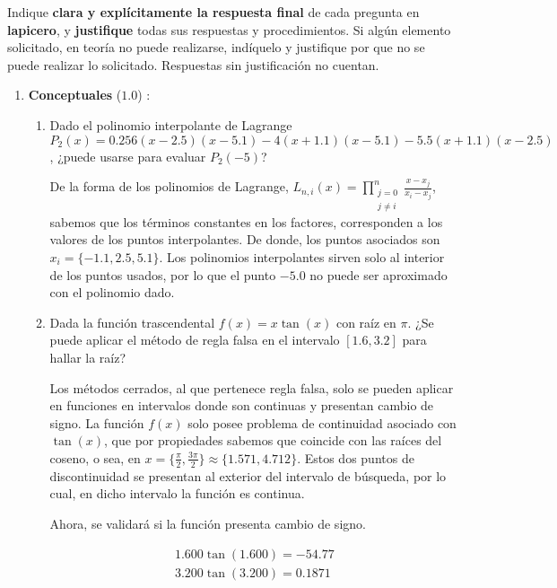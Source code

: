 \documentclass[12pt]{article}
\begin{document}
Indique \textbf{clara y explícitamente la respuesta final} de cada pregunta en \textbf{lapicero}, y \textbf{justifique} todas sus respuestas y procedimientos. Si algún elemento solicitado, en teoría no puede realizarse, indíquelo y justifique por que no se puede realizar lo solicitado. Respuestas sin justificación no cuentan.
  

  \begin{enumerate}[leftmargin=*,widest=9]
    \item \textbf{Conceptuales} ($1.0$) : 
    
    \begin{enumerate}[label=\alph*]
    \item Dado el polinomio interpolante de Lagrange \(P_2(x) = 0.256(x-2.5)(x-5.1) - 4(x+1.1)(x-5.1) - 5.5(x+1.1)(x-2.5) \), ¿puede usarse para evaluar \(P_2(-5)\)?
    
    De la forma de los polinomios de Lagrange, \( L_{n, i}(x) = \prod\limits_{\substack{j = 0\\ j \neq i}}^n \frac{x- x_j}{x_i - x_j}\), sabemos que los términos constantes en los factores, corresponden a los valores de los puntos interpolantes. De donde, los puntos asociados son \(x_i = \lbrace -1.1, 2.5, 5.1 \rbrace \). Los polinomios interpolantes sirven solo al interior de los puntos usados, por lo que el punto \(-5.0\) no puede ser aproximado con el polinomio dado.

    \item Dada la función trascendental \(f(x) = x\tan(x)\) con raíz en \(\pi\). ¿Se puede aplicar el método de regla falsa en el intervalo \( \left[1.6, 3.2\right] \) para hallar la raíz?
    
    Los métodos cerrados, al que pertenece regla falsa, solo se pueden aplicar en funciones en intervalos donde son continuas y presentan cambio de signo. La función \(f(x)\) solo posee problema de continuidad asociado con \(\tan(x)\), que por propiedades sabemos que coincide con las raíces del coseno, o sea, en \(x = \lbrace \frac{\pi}{2}, \frac{3\pi}{2} \rbrace \approx \lbrace 1.571, 4.712 \rbrace \). Estos dos puntos de discontinuidad se presentan al exterior del intervalo de búsqueda, por lo cual, en dicho intervalo la función es continua.
    
    Ahora, se validará si la función presenta cambio de signo.
    
    \begin{eqnarray*}
    1.600 \tan(1.600) = -54.77 \\
    3.200 \tan(3.200) = 0.1871 
    \end{eqnarray*}
    

\end{enumerate}
\end{enumerate}
\end{document}
